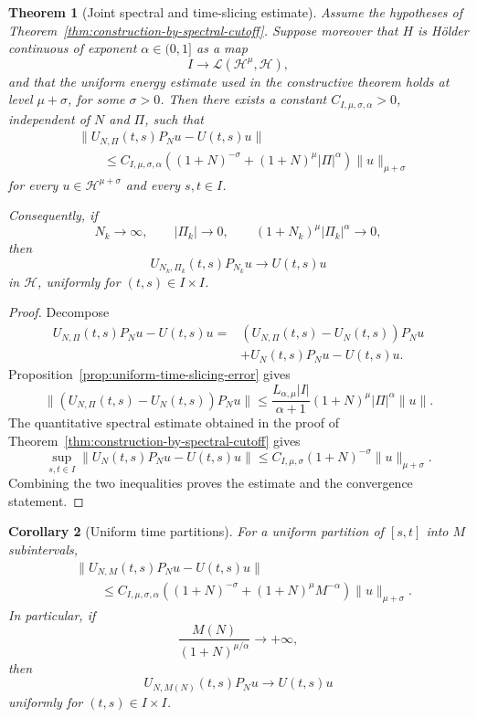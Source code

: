 \documentclass[11pt]{amsart}
\theoremstyle{plain}
\newtheorem{theorem}{Theorem}[section]
\newtheorem{corollary}[theorem]{Corollary}
\theoremstyle{definition}
\theoremstyle{remark}
\newcommand{\Hilb}{\mathcal H}
\begin{document}
\begin{theorem}[Joint spectral and time-slicing estimate]
\label{thm:joint-spectral-time-slicing}
Assume the hypotheses of
Theorem~\ref{thm:construction-by-spectral-cutoff}. Suppose moreover that
\(H\) is Hölder continuous of exponent \(\alpha\in(0,1]\) as a map
\[
 I\longrightarrow\mathcal L(\Hilb^\mu,\Hilb),
\]
and that the uniform energy estimate used in the constructive theorem holds
at level \(\mu+\sigma\), for some \(\sigma>0\). Then there exists a constant
\(C_{I,\mu,\sigma,\alpha}>0\), independent of \(N\) and \(\Pi\), such that
\[
\begin{aligned}
 &\|U_{N,\Pi}(t,s)P_Nu-U(t,s)u\| \\
 &\qquad\leq
 C_{I,\mu,\sigma,\alpha}
 \left((1+N)^{-\sigma}+(1+N)^\mu|\Pi|^\alpha\right)
 \|u\|_{\mu+\sigma}
\end{aligned}
\]
for every \(u\in\Hilb^{\mu+\sigma}\) and every \(s,t\in I\).

Consequently, if
\[
 N_k\longrightarrow\infty,
 \qquad
 |\Pi_k|\longrightarrow0,
 \qquad
 (1+N_k)^\mu|\Pi_k|^\alpha\longrightarrow0,
\]
then
\[
 U_{N_k,\Pi_k}(t,s)P_{N_k}u
 \longrightarrow U(t,s)u
\]
in \(\Hilb\), uniformly for \((t,s)\in I\times I\).
\end{theorem}

\begin{proof}
Decompose
\[
\begin{aligned}
 U_{N,\Pi}(t,s)P_Nu-U(t,s)u
 ={}&
 (U_{N,\Pi}(t,s)-U_N(t,s))P_Nu \\
 &+U_N(t,s)P_Nu-U(t,s)u.
\end{aligned}
\]
Proposition~\ref{prop:uniform-time-slicing-error} gives
\[
 \|(U_{N,\Pi}(t,s)-U_N(t,s))P_Nu\|
 \leq
 \frac{L_{\alpha,\mu}|I|}{\alpha+1}
 (1+N)^\mu|\Pi|^\alpha\|u\|.
\]
The quantitative spectral estimate obtained in the proof of
Theorem~\ref{thm:construction-by-spectral-cutoff} gives
\[
 \sup_{s,t\in I}
 \|U_N(t,s)P_Nu-U(t,s)u\|
 \leq
 C_{I,\mu,\sigma}(1+N)^{-\sigma}\|u\|_{\mu+\sigma}.
\]
Combining the two inequalities proves the estimate and the convergence
statement.
\end{proof}

\begin{corollary}[Uniform time partitions]
\label{cor:uniform-time-partitions}
For a uniform partition of \([s,t]\) into \(M\) subintervals,
\[
\begin{aligned}
 &\|U_{N,M}(t,s)P_Nu-U(t,s)u\| \\
 &\qquad\leq
 C_{I,\mu,\sigma,\alpha}
 \left((1+N)^{-\sigma}+(1+N)^\mu M^{-\alpha}\right)
 \|u\|_{\mu+\sigma}.
\end{aligned}
\]
In particular, if
\[
 \frac{M(N)}{(1+N)^{\mu/\alpha}}\longrightarrow+\infty,
\]
then
\[
 U_{N,M(N)}(t,s)P_Nu\longrightarrow U(t,s)u
\]
uniformly for \((t,s)\in I\times I\).
\end{corollary}
\end{document}
